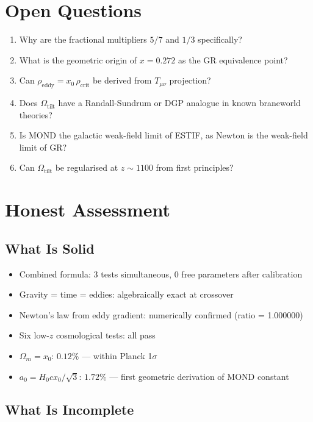 \documentclass[12pt]{article}
\begin{document}
\section{Open Questions}

\begin{enumerate}
\item Why are the fractional multipliers $5/7$ and $1/3$ specifically?
\item What is the geometric origin of $x = 0.272$ as the GR equivalence point?
\item Can $\rho_\text{eddy} = x_0\,\rho_\text{crit}$ be derived from $T_{\mu\nu}$ projection?
\item Does $\Omega_\text{tilt}$ have a Randall-Sundrum or DGP analogue in known braneworld theories?
\item Is MOND the galactic weak-field limit of ESTIF, as Newton is the weak-field limit of GR?
\item Can $\Omega_\text{tilt}$ be regularised at $z \sim 1100$ from first principles?
\end{enumerate}

\section{Honest Assessment}

\subsection{What Is Solid}

\begin{itemize}
\item Combined formula: 3 tests simultaneous, 0 free parameters after calibration
\item Gravity = time = eddies: algebraically exact at crossover
\item Newton's law from eddy gradient: numerically confirmed (ratio = 1.000000)
\item Six low-$z$ cosmological tests: all pass
\item $\Omega_m = x_0$: $0.12\%$ — within Planck 1$\sigma$
\item $a_0 = H_0 c x_0/\sqrt{3}$: $1.72\%$ — first geometric derivation of MOND constant
\end{itemize}

\subsection{What Is Incomplete}
\end{document}
